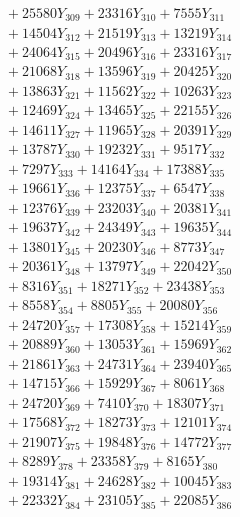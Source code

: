 \documentclass[a4paper,10pt]{article}
\begin{document}
{\begin{align}
&\;  + 25580 Y_{309} + 23316 Y_{310} + 7555 Y_{311} \\[0.3ex]
&\;  + 14504 Y_{312} + 21519 Y_{313} + 13219 Y_{314} \\[0.3ex]
&\;  + 24064 Y_{315} + 20496 Y_{316} + 23316 Y_{317} \\[0.3ex]
&\;  + 21068 Y_{318} + 13596 Y_{319} + 20425 Y_{320} \\[0.3ex]
&\;  + 13863 Y_{321} + 11562 Y_{322} + 10263 Y_{323} \\[0.3ex]
&\;  + 12469 Y_{324} + 13465 Y_{325} + 22155 Y_{326} \\[0.3ex]
&\;  + 14611 Y_{327} + 11965 Y_{328} + 20391 Y_{329} \\[0.5ex]\allowbreak
&\;  + 13787 Y_{330} + 19232 Y_{331} + 9517 Y_{332} \\[0.3ex]
&\;  + 7297 Y_{333} + 14164 Y_{334} + 17388 Y_{335} \\[0.3ex]
&\;  + 19661 Y_{336} + 12375 Y_{337} + 6547 Y_{338} \\[0.3ex]
&\;  + 12376 Y_{339} + 23203 Y_{340} + 20381 Y_{341} \\[0.3ex]
&\;  + 19637 Y_{342} + 24349 Y_{343} + 19635 Y_{344} \\[0.3ex]
&\;  + 13801 Y_{345} + 20230 Y_{346} + 8773 Y_{347} \\[0.3ex]
&\;  + 20361 Y_{348} + 13797 Y_{349} + 22042 Y_{350} \\[0.3ex]
&\;  + 8316 Y_{351} + 18271 Y_{352} + 23438 Y_{353} \\[0.3ex]
&\;  + 8558 Y_{354} + 8805 Y_{355} + 20080 Y_{356} \\[0.3ex]
&\;  + 24720 Y_{357} + 17308 Y_{358} + 15214 Y_{359} \\[0.5ex]\allowbreak
&\;  + 20889 Y_{360} + 13053 Y_{361} + 15969 Y_{362} \\[0.3ex]
&\;  + 21861 Y_{363} + 24731 Y_{364} + 23940 Y_{365} \\[0.3ex]
&\;  + 14715 Y_{366} + 15929 Y_{367} + 8061 Y_{368} \\[0.3ex]
&\;  + 24720 Y_{369} + 7410 Y_{370} + 18307 Y_{371} \\[0.3ex]
&\;  + 17568 Y_{372} + 18273 Y_{373} + 12101 Y_{374} \\[0.3ex]
&\;  + 21907 Y_{375} + 19848 Y_{376} + 14772 Y_{377} \\[0.3ex]
&\;  + 8289 Y_{378} + 23358 Y_{379} + 8165 Y_{380} \\[0.3ex]
&\;  + 19314 Y_{381} + 24628 Y_{382} + 10045 Y_{383} \\[0.3ex]
&\;  + 22332 Y_{384} + 23105 Y_{385} + 22085 Y_{386} \\[0.3ex]

\end{align}}
\end{document}
